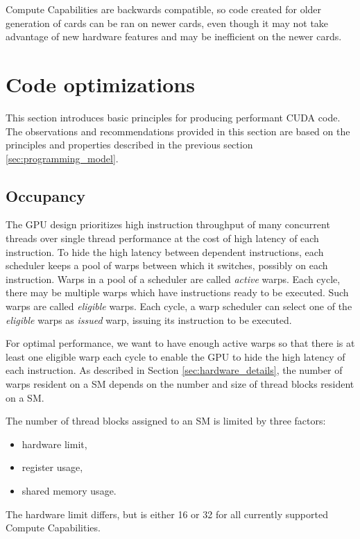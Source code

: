 Compute Capabilities are backwards compatible, so code created for older generation of cards can be ran on newer cards, even though it may not take advantage of new hardware features and may be inefficient on the newer cards.

\section{Code optimizations}


This section introduces basic principles for producing performant CUDA code.
The observations and recommendations provided in this section are based on the principles and properties described in the previous section \ref{sec:programming_model}.

\subsection{Occupancy}
\label{sec:occupancy}

The GPU design prioritizes high instruction throughput of many concurrent threads over single thread performance at the cost of high latency of each instruction. To hide the high latency between dependent instructions, each scheduler keeps a pool of warps between which it switches, possibly on each instruction. Warps in a pool of a scheduler are called \textit{active} warps.
Each cycle, there may be multiple warps which have instructions ready to be executed. Such warps are called \textit{eligible} warps.
Each cycle, a warp scheduler can select one of the \textit{eligible} warps as \textit{issued} warp, issuing its instruction to be executed.

For optimal performance, we want to have enough active warps so that there is at least one eligible warp each cycle to enable the GPU to hide the high latency of each instruction. As described in Section \ref{sec:hardware_details}, the number of warps resident on a SM depends on the number and size of thread blocks resident on a SM.

The number of thread blocks assigned to an SM is limited by three factors:

\begin{itemize}
	\item hardware limit,
	\item register usage,
	\item shared memory usage.
\end{itemize}

The hardware limit differs, but is either 16 or 32 for all currently supported Compute Capabilities. 

